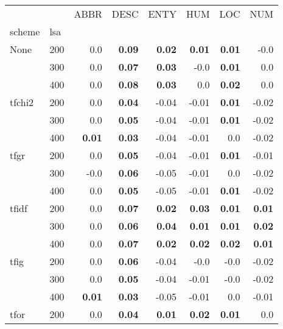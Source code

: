 \begin{table}[H]
\begin{center}

\begin{tabular}{ll|rrrrrr}
\toprule
   &   & ABBR & DESC & ENTY & HUM & LOC & NUM \\
scheme & lsa &         &         &         &         &         &         \\
\midrule
None & 200 &       0.0 &  \textbf{0.09} &  \textbf{0.02} &  \textbf{0.01} &  \textbf{0.01} &      -0.0 \\
   & 300 &       0.0 &  \textbf{0.07} &  \textbf{0.03} &      -0.0 &  \textbf{0.01} &       0.0 \\
   & 400 &       0.0 &  \textbf{0.08} &  \textbf{0.03} &       0.0 &  \textbf{0.02} &       0.0 \\
tfchi2 & 200 &       0.0 &  \textbf{0.04} &      -0.04 &      -0.01 &  \textbf{0.01} &      -0.02 \\
   & 300 &       0.0 &  \textbf{0.05} &      -0.04 &      -0.01 &  \textbf{0.01} &      -0.02 \\
   & 400 &  \textbf{0.01} &  \textbf{0.03} &      -0.04 &      -0.01 &       0.0 &      -0.02 \\
tfgr & 200 &       0.0 &  \textbf{0.05} &      -0.04 &      -0.01 &  \textbf{0.01} &      -0.01 \\
   & 300 &       -0.0 &  \textbf{0.06} &      -0.05 &      -0.01 &       0.0 &      -0.02 \\
   & 400 &       0.0 &  \textbf{0.05} &      -0.05 &      -0.01 &  \textbf{0.01} &      -0.02 \\
tfidf & 200 &       0.0 &  \textbf{0.07} &  \textbf{0.02} &  \textbf{0.03} &  \textbf{0.01} &  \textbf{0.01} \\
   & 300 &       0.0 &  \textbf{0.06} &  \textbf{0.04} &  \textbf{0.01} &  \textbf{0.01} &  \textbf{0.02} \\
   & 400 &       0.0 &  \textbf{0.07} &  \textbf{0.02} &  \textbf{0.02} &  \textbf{0.02} &  \textbf{0.01} \\
tfig & 200 &       0.0 &  \textbf{0.06} &      -0.04 &      -0.0 &      -0.0 &      -0.02 \\
   & 300 &       0.0 &  \textbf{0.05} &      -0.04 &      -0.01 &      -0.0 &      -0.02 \\
   & 400 &  \textbf{0.01} &  \textbf{0.03} &      -0.05 &      -0.01 &       0.0 &      -0.01 \\
tfor & 200 &       0.0 &  \textbf{0.04} &  \textbf{0.01} &  \textbf{0.02} &  \textbf{0.01} &       0.0 \\

\end{tabular}
\end{center}
\end{table}

